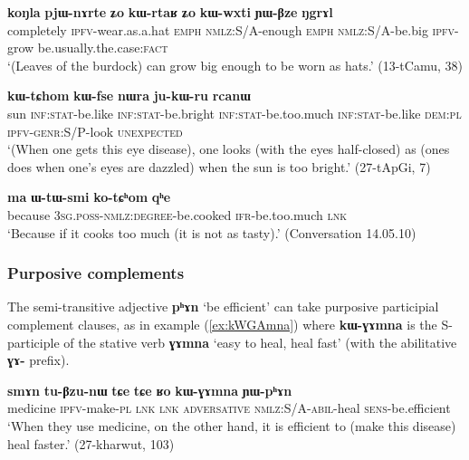 \documentclass[oldfontcommands,oneside,a4paper,11pt]{article}
\newcommand{\ipa}[1]{\textbf{\phon#1}} %
\newcommand{\jpg}[2]{\ipa{#1} `#2'} %
\begin{document}
\begin{exe}
\ex \label{ex:pjWnArte}
\gll \ipa{koŋla} 	\ipa{pjɯ-nɤrte} 	\ipa{ʑo} 	\ipa{kɯ-rtaʁ} 	\ipa{ʑo} 	\ipa{kɯ-wxti} 	\ipa{ɲɯ-βze} 	\ipa{ŋgrɤl}  \\
completely \textsc{ipfv}-wear.as.a.hat \textsc{emph} \textsc{nmlz}:S/A-enough \textsc{emph} \textsc{nmlz}:S/A-be.big \textsc{ipfv}-grow be.usually.the.case:\textsc{fact} \\
\glt `(Leaves of the burdock) can grow big enough to be worn as hats.' (13-tCamu, 38)
\end{exe}
 
\begin{exe}
\ex \label{ex:kWfsoR.kWtChom}
\gll [\ipa{tɤŋe} 	\ipa{kɯ-fse} 	\ipa{kɯ-fsoʁ}] 	\ipa{kɯ-tɕhom} 	\ipa{kɯ-fse} 	\ipa{nɯra} 	\ipa{ju-kɯ-ru} 	\ipa{rcanɯ} \\
sun \textsc{inf:stat}-be.like \textsc{inf:stat}-be.bright \textsc{inf:stat}-be.too.much \textsc{inf:stat}-be.like \textsc{dem:pl} \textsc{ipfv-genr}:S/P-look \textsc{unexpected} \\
\glt `(When one gets this eye disease), one looks (with the eyes half-closed) as (ones does when one's eyes are dazzled) when the sun is too bright.' (27-tApGi, 7)
\end{exe}

\begin{exe}
\ex \label{ex:kotChom}
\gll
\ipa{ma} 	\ipa{ɯ-tɯ-smi} 	\ipa{ko-tɕʰom} 	\ipa{qʰe} \\
because \textsc{3sg.poss-nmlz:degree}-be.cooked \textsc{ifr}-be.too.much \textsc{lnk} \\
\glt `Because if it cooks too much (it is not as tasty).' (Conversation 14.05.10)
\end{exe}

\subsubsection{Purposive complements}
The semi-transitive adjective \jpg{pʰɤn}{be efficient} can take purposive participial complement clauses, as in example (\ref{ex:kWGAmna}) where \ipa{kɯ-ɣɤmna} is the S-participle of the stative verb \ipa{ɣɤmna} `easy to heal, heal fast' (with the abilitative \ipa{ɣɤ-} prefix). 
 
 \begin{exe}
\ex \label{ex:kWGAmna}
\gll \ipa{smɤn} 	\ipa{tu-βzu-nɯ} 	\ipa{tɕe} 	\ipa{tɕe} 	\ipa{ʁo} 	\ipa{kɯ-ɣɤmna} 	\ipa{ɲɯ-pʰɤn} \\
medicine \textsc{ipfv}-make-\textsc{pl} \textsc{lnk} \textsc{lnk} \textsc{adversative}  \textsc{nmlz:S/A}-\textsc{abil}-heal \textsc{sens}-be.efficient \\
\glt `When they use medicine, on the other hand, it is efficient to (make this disease) heal faster.' (27-kharwut, 103)
\end{exe}
\end{document}
